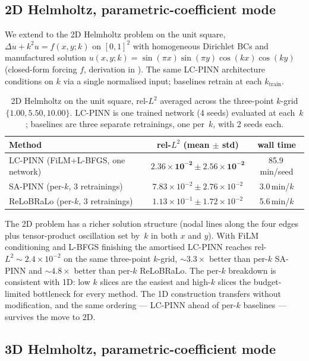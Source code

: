 \subsection{2D Helmholtz, parametric-coefficient mode}
\label{sec:results-helmholtz-2d}

We extend to the 2D Helmholtz problem on the unit square,
$\Delta u + k^2 u = f(x, y; k)$ on $[0,1]^2$ with homogeneous
Dirichlet BCs and manufactured solution
$u(x, y; k) = \sin(\pi x)\sin(\pi y)\cos(kx)\cos(ky)$ (closed-form
forcing $f$, derivation in ). The same
LC-PINN architecture conditions on $k$ via a single normalised
input; baselines retrain at each $k_{\text{train}}$.

\begin{table}[h]
\centering
\caption{2D Helmholtz on the unit square, rel-$L^2$ averaged
across the three-point $k$-grid $\{1.00, 5.50, 10.00\}$.
LC-PINN is one trained network (4 seeds) evaluated at each~$k$;
baselines are three separate retrainings, one per~$k$, with 2 seeds
each.}
\label{tab:helmholtz-2d}
\begin{tabular}{lcc}
\toprule
Method & rel-$L^2$ (mean $\pm$ std) & wall time \\
\midrule
LC-PINN (FiLM+L-BFGS, one network) & $\mathbf{2.36 \times 10^{-2} \pm 2.56 \times 10^{-2}}$ & 85.9\,min/seed \\
SA-PINN (per-$k$, 3 retrainings)   & $7.83 \times 10^{-2} \pm 2.76 \times 10^{-2}$ & 3.0\,min/$k$ \\
ReLoBRaLo (per-$k$, 3 retrainings) & $1.13 \times 10^{-1} \pm 1.72 \times 10^{-2}$ & 5.6\,min/$k$ \\
\bottomrule
\end{tabular}
\end{table}

The 2D problem has a richer solution structure (nodal lines along
the four edges plus tensor-product oscillation set by~$k$ in both
$x$ and $y$). With FiLM conditioning and L-BFGS finishing the
amortised LC-PINN reaches rel-$L^2 \!\sim\! 2.4 \times 10^{-2}$ on
the same three-point $k$-grid, $\sim\!3.3\times$ better than per-$k$
SA-PINN and $\sim\!4.8\times$ better than per-$k$ ReLoBRaLo. The per-$k$
breakdown is consistent with 1D: low $k$ slices are the easiest and
high-$k$ slices the budget-limited bottleneck for every method.
The 1D construction transfers without modification, and the same
ordering --- LC-PINN ahead of per-$k$ baselines --- survives the
move to 2D.

\subsection{3D Helmholtz, parametric-coefficient mode}
\label{sec:results-helmholtz-3d}

